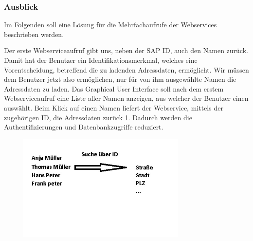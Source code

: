 \FloatBarrier
\subsubsection{Ausblick}

Im Folgenden soll eine Lösung für die Mehrfachaufrufe der Webservices beschrieben werden.

Der erste Webserviceaufruf gibt uns, neben der SAP ID, auch den Namen zurück. Damit hat der Benutzer ein Identifikationsmerkmal, 
welches eine Vorentscheidung, betreffend die zu ladenden Adressdaten, ermöglicht. Wir müssen dem Benutzer jetzt also ermöglichen, nur für 
von ihm ausgewählte Namen die Adressdaten zu laden. Das Graphical User Interface soll nach dem erstem Webserviceaufruf eine 
Liste aller Namen anzeigen, aus welcher der Benutzer einen auswählt. Beim Klick auf einen Namen liefert der Webservice, 
mittels der zugehörigen ID, die Adressdaten zurück \ref{fig:sapbild2}. Dadurch werden die Authentifizierungen und Datenbankzugriffe reduziert.

\begin{figure}[h!t]
\begin{center}
\includegraphics[width=0.75\textwidth]{Bilder/presi2.jpg}
\end{center}
\caption{}
\label{fig:sapbild2}
\end{figure}
\FloatBarrier